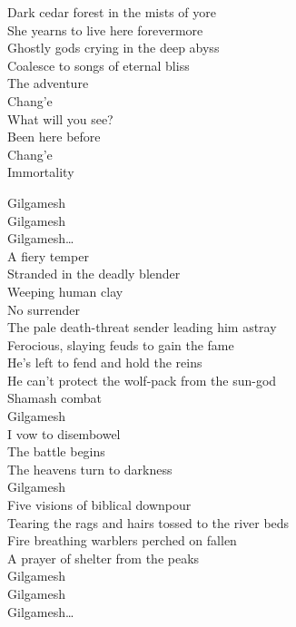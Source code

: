 Dark cedar forest in the mists of yore \\
She yearns to live here forevermore \\
Ghostly gods crying in the deep abyss \\
Coalesce to songs of eternal bliss \\

The adventure \\
Chang'e \\
What will you see? \\
Been here before \\
Chang'e \\
Immortality \\



Gilgamesh \\
Gilgamesh \\
Gilgamesh… \\

A fiery temper \\
Stranded in the deadly blender \\
Weeping human clay \\
No surrender \\
The pale death-threat sender leading him astray \\
Ferocious, slaying feuds to gain the fame \\
He's left to fend and hold the reins \\
He can't protect the wolf-pack from the sun-god \\
Shamash combat \\

Gilgamesh \\
I vow to disembowel \\
The battle begins \\
The heavens turn to darkness \\
Gilgamesh \\

Five visions of biblical downpour \\
Tearing the rags and hairs tossed to the river beds \\
Fire breathing warblers perched on fallen \\
A prayer of shelter from the peaks \\

Gilgamesh \\
Gilgamesh \\
Gilgamesh… \\

